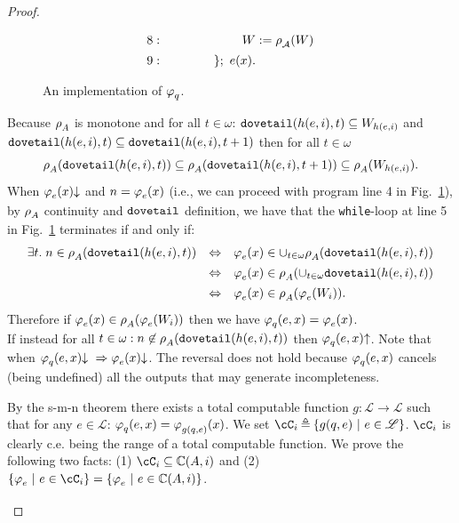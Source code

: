 \documentclass[runningheads]{llncs}
\def\ok#1{\mbox{\raisebox{0ex}[1ex][1ex]{$#1$}}}
\def\re{c.e.}
\def\bbbc{{\mathbb{C}}}
\def\dovetl{{\tt dovetail}}
\newcommand{\ccL}{\mathscr{L}}
\newcommand{\pfunction}[3]{\ok{\varphi^{#2\, #3}_{#1}}}
\newcommand{\auco}[2]{\ok{\rho^{#1}_{#2}}}
\newcommand{\ra}{\rightarrow}
\newcommand{\Ra}{\Rightarrow}
\newcommand{\ud}{\ok{\:\triangleq\:}}
\def\ok#1{\mbox{\raisebox{0ex}[1ex][1ex]{$#1$}}}
\def\cAA{\ensuremath{A}}
\newcommand{\sset}[2]{\{#1  ~|~ #2\}}
\begin{document}
\begin{proof}
\begin{figure}[t]
\begin{align*}
    &8:~\qquad\qquad\qquad W := \auco{}{\mathcal{A}}(W)\\
    &9:~\qquad\qquad \};\ e(x).
    \end{align*}
    \caption{An implementation of $\pfunction{q}{}{}$.}\label{code1}
    \end{figure}
    Because $\auco{}{A}$ is monotone and for all $t\in\omega$:
    $\dovetl(h(e,i),t)\subseteq W_{h(e,i)}$ and $\dovetl(h(e,i),t)\subseteq \dovetl(h(e,i),t+1)$
    then for all $t\in\omega$
    $$\auco{}{\cAA}(\dovetl(h(e,i),t))\subseteq \auco{}{\cAA}(\dovetl(h(e,i),t+1))\subseteq \auco{}{A}(W_{h(e,i)}).$$ 
    When $\pfunction{e}{}{}(x){\downarrow}$ and $n=\pfunction{e}{}{}(x)$ (i.e., we can proceed with program line 4 in Fig.~\ref{code1}), by $\auco{}{\cAA}$ continuity and $\dovetl$ definition, we have that the {\tt while}-loop at line 5 in Fig.~\ref{code1} terminates if and only if: 
    \[
    \begin{array}{lll}
    \exists t.\; n\in\auco{}{\cAA}(\dovetl(h(e,i),t)) &\Leftrightarrow&\pfunction{e}{}{}(x)\in\cup_{t\in\omega}\auco{}{\cAA}(\dovetl(h(e,i),t))\\[1ex]
    &\Leftrightarrow&\pfunction{e}{}{}(x)\in\auco{}{\cAA}(\cup_{t\in\omega}\dovetl(h(e,i),t))\\[1ex]
    &\Leftrightarrow&\pfunction{e}{}{}(x)\in\auco{}{\cAA}(\pfunction{e}{}{}(W_i)).
    \end{array}
    \]
    Therefore if $\pfunction{e}{}{}(x)\in\auco{}{\cAA}(\pfunction{e}{}{}(W_i))$ then we have
    $\pfunction{q}{}{}(e,x)=\pfunction{e}{}{}(x)$.\\
    If instead for all $t\in\omega: n\not\in\auco{}{\cAA}(\dovetl(h(e,i),t))$ then $\pfunction{q}{}{}(e,x){\uparrow}$.
    Note that when $\pfunction{q}{}{}(e,x){\downarrow}~\Ra\pfunction{e}{}{}(x){\downarrow}$. The reversal does not hold because $\pfunction{q}{}{}(e,x)$ cancels (being undefined) all the outputs that may generate incompleteness. 
    
    By the s-m-n theorem there exists a total computable function $g:\ccL\ra\ccL$ such that for any $e\in\ccL$: $\pfunction{q}{}{}(e,x)=\pfunction{g(q,e)}{}{}(x)$. We set $\cC_i\ud \sset{g(q,e)}{e\in\ccL}$. $\cC_i$ is clearly {\re} being the range of a total computable function. We prove the following two facts: (1) $\cC_i\subseteq \bbbc(\cAA,i)$ and (2) $\sset{\pfunction{e}{}{}}{e\in\cC_i}=\sset{\pfunction{e}{}{}}{e\in\bbbc(\cAA,i)}$.
    \begin{enumerate}
        

\end{enumerate}
\end{proof}
\end{document}

